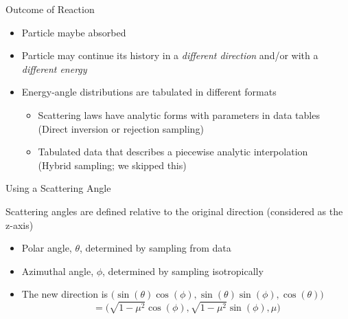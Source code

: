 \documentclass[xcolor=x11names,compress,handout]{beamer}
\renewcommand{\(}{\begin{columns}}
\renewcommand{\)}{\end{columns}}
\newcommand{\<}[1]{\begin{column}{#1}}
\renewcommand{\>}{\end{column}}
\begin{document}
\begin{frame}{Outcome of Reaction}

\begin{itemize}
    \item Particle maybe absorbed
\vspace*{1em}
    \item Particle may continue its history in a \textit{different direction} and/or with a \textit{different energy}
\vspace*{1em}
    \item Energy-angle distributions are tabulated in different formats
    \begin{itemize}
      \item Scattering laws have analytic forms with parameters in data tables\\
      (Direct inversion or rejection sampling)
      \item Tabulated data that describes a piecewise analytic interpolation\\
      (Hybrid sampling; we skipped this)
    \end{itemize}
\end{itemize}

\end{frame}


\begin{frame}{Using a Scattering Angle}

Scattering angles are defined relative to the original direction (considered as the z-axis)

\begin{itemize}
    \item Polar angle, $\theta$, determined by sampling from data
\vspace*{0.5em}
    \item Azimuthal angle, $\phi$, determined by sampling isotropically
    \vspace*{0.5em}
    \item The new direction is $\bigl(\sin(\theta) \cos(\phi), \sin(\theta) \sin(\phi), \cos(\theta)\bigr)$ \[= \bigl(\sqrt{1 - \mu^2} \cos(\phi),  \sqrt{1 - \mu^2} \sin(\phi), \mu \bigr)\]
\end{itemize}


\end{frame}
\end{document}
